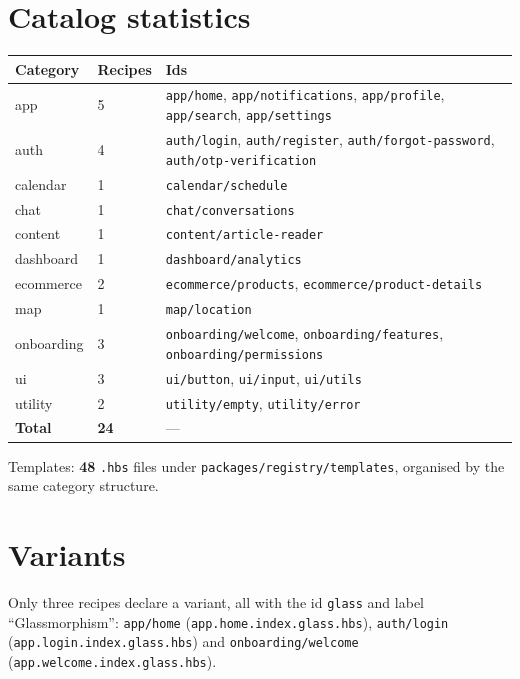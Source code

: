 \section{Catalog statistics}

\begin{table}[H]
\centering
\caption{Catalog composition (verified)}
\begin{longtable}{p{3.2cm}p{1.6cm}p{9cm}}
\toprule
\textbf{Category} & \textbf{Recipes} & \textbf{Ids} \\
\midrule
\endhead
app & 5 & \texttt{app/home}, \texttt{app/notifications}, \texttt{app/profile},
\texttt{app/search}, \texttt{app/settings} \\
auth & 4 & \texttt{auth/login}, \texttt{auth/register},
\texttt{auth/forgot-password}, \texttt{auth/otp-verification} \\
calendar & 1 & \texttt{calendar/schedule} \\
chat & 1 & \texttt{chat/conversations} \\
content & 1 & \texttt{content/article-reader} \\
dashboard & 1 & \texttt{dashboard/analytics} \\
ecommerce & 2 & \texttt{ecommerce/products}, \texttt{ecommerce/product-details} \\
map & 1 & \texttt{map/location} \\
onboarding & 3 & \texttt{onboarding/welcome}, \texttt{onboarding/features},
\texttt{onboarding/permissions} \\
ui & 3 & \texttt{ui/button}, \texttt{ui/input}, \texttt{ui/utils} \\
utility & 2 & \texttt{utility/empty}, \texttt{utility/error} \\
\midrule
\textbf{Total} & \textbf{24} & --- \\
\bottomrule
\end{longtable}
\end{table}

Templates: \textbf{48} \texttt{.hbs} files under
\texttt{packages/registry/templates}, organised by the same category structure.

\section{Variants}

Only three recipes declare a variant, all with the id \texttt{glass} and label
``Glassmorphism'':
\texttt{app/home} (\texttt{app.home.index.glass.hbs}),
\texttt{auth/login} (\texttt{app.login.index.glass.hbs}) and
\texttt{onboarding/welcome} (\texttt{app.welcome.index.glass.hbs}).


